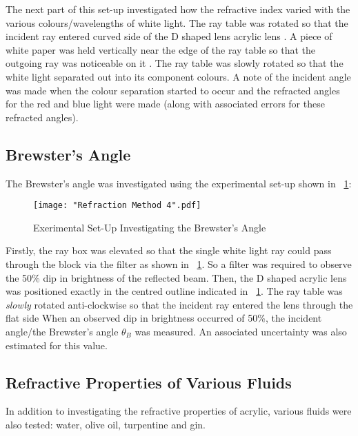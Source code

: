 \documentclass{article}
\newcommand{\figref}[2][\figurename~]{#1\ref{#2}}
\begin{document}
\vspace{2mm}
\noindent
The next part of this set-up investigated how the refractive index varied with the various colours/wavelengths of white light. The ray table was rotated so that the incident ray entered curved side of the D shaped lens acrylic lens \cite{Paper01}. A piece of white paper was held vertically near the edge of the ray table so that the outgoing ray was noticeable on it \cite{Paper01}. The ray table was slowly rotated so that the white light separated out into its component colours. A note of the incident angle was made when the colour separation started to occur and the refracted angles for the red and blue light were made (along with associated errors for these refracted angles). 


\subsection{Brewster's Angle}
\label{ssec:brewster's-angle}

The Brewster's angle was investigated using the experimental set-up shown in \figref{fig:method4}:

\begin{figure}[h]
\centering
\texttt{[image: "Refraction Method 4".pdf]}
\caption{Exerimental Set-Up Investigating the Brewster's Angle}
\label{fig:method4}
\end{figure}

\noindent
Firstly, the ray box was elevated so that the single white light ray could pass through the block via the filter as shown in \figref{fig:method4}. So a filter was required to observe the 50\% dip in brightness of the reflected beam. Then, the D shaped acrylic lens was positioned exactly in the centred outline indicated in \figref{fig:method4}. The ray table was \textit{slowly} rotated anti-clockwise so that the incident ray entered the lens through the flat side \cite{Paper01} When an observed dip in brightness occurred of 50\%, the incident angle/the Brewster's angle $\theta_B$ was measured. An associated uncertainty was also estimated for this value.

\subsection{Refractive Properties of Various Fluids}
\label{ssec:properties-of-fluids-method}

In addition to investigating the refractive properties of acrylic, various fluids were also tested: water, olive oil, turpentine and gin.
\end{document}
